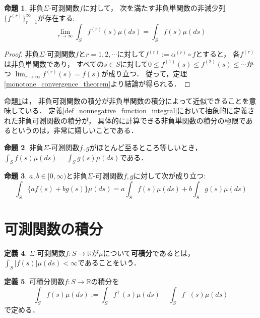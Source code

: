 \documentclass{jsreport}
\theoremstyle{definition}
\newtheorem{defi}{定義}[section]
\newtheorem{prop}[defi]{命題}
\begin{document}
\begin{prop}\label{prop_approximation_of_nonnegative_function_integral}
非負$\Sigma$-可測関数$f$に対して，
次を満たす非負単関数の非減少列$\{f^{(r)}\}_{r=1}^\infty$が存在する:
\[ \lim_{r\to\infty}\int_Sf^{(r)}(s)\mu(ds)=\int_Sf(s)\mu(ds) \]
\end{prop}

\begin{proof}
非負$\Sigma$-可測関数$f$と$r=1,2,\cdots$に対して$f^{(r)}:=\alpha^{(r)} \circ f$とすると，
各$f^{(r)}$は非負単関数であり，
すべての$s \in S$に対して$0 \leq f^{(1)}(s) \leq f^{(2)}(s) \leq\cdots$かつ
$\displaystyle\lim_{r\to\infty}f^{(r)}(s)=f(s)$が成り立つ．
従って，定理\ref{monotone_convergence_theorem}より結論が得られる．
\end{proof}

命題\ref{prop_approximation_of_nonnegative_function_integral}は，
非負可測関数の積分が非負単関数の積分によって近似できることを意味している．
定義\ref{def_nonnegative_function_integral}において抽象的に定義された非負可測関数の積分が，
具体的に計算できる非負単関数の積分の極限であるというのは，非常に嬉しいことである．

\begin{prop}\label{prop_equal_ae_then_integral_equal}
非負$\Sigma$-可測関数$f,g$がほとんど至るところ等しいとき，
$\displaystyle\int_Sf(s)\mu(ds)=\int_Sg(s)\mu(ds)$である．
\end{prop}

\begin{prop}\label{prop_linearity_of_nonnegative_function_integral}
$a,b\in[0,\infty)$と非負$\Sigma$-可測関数$f,g$に対して次が成り立つ:
\[ \int_S\{af(s)+bg(s)\}\mu(ds)=a\int_Sf(s)\mu(ds)+b\int_Sg(s)\mu(ds) \]
\end{prop}

\section{可測関数の積分}

\begin{defi}\label{def_integrable_function}
$\Sigma$-可測関数$f \colon S\to\mathbb{R}$が$\mu$について\textbf{可積分}であるとは，
$\displaystyle\int_S|f(s)|\mu(ds)<\infty$であることをいう．

\end{defi}

\begin{defi}\label{def_measurable_function_integral}
可積分関数$f \colon S\to\mathbb{R}$の積分を
\[ \int_S f(s)\mu(ds):=\int_S f^+(s)\mu(ds)-\int_S f^-(s)\mu(ds)  \]
で定める．
\end{defi}
\end{document}
